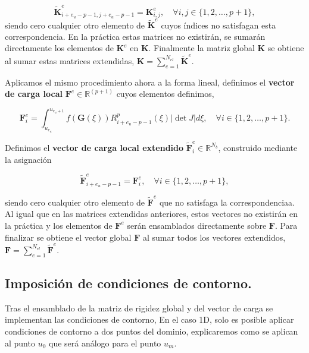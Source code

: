\documentclass[11pt]{book}
\theoremstyle{plain} %
\theoremstyle{definition} %
\theoremstyle{definition} %
\begin{document}
\begin{equation*}
    \widetilde{\mathbf{K}}^e_{i + e_u - p - 1,  j + e_u - p - 1} = \mathbf{K}_{i,j}^e,\quad \forall i,j \in \{1,2, \dots, p+1\},
\end{equation*}
\noindent
siendo cero cualquier otro elemento de $\widetilde{\mathbf{K}}^e$ cuyos índices no satisfagan esta correspondencia.
En la práctica estas matrices no existirán, se sumarán directamente los elementos de $\mathbf{K}^e$ en $\mathbf{K}$.
Finalmente la matriz global $\mathbf{K}$ se obtiene al sumar estas matrices extendidas, $\mathbf{K} = \sum_{e=1}^{N_{el}} \widetilde{\mathbf{K}}^e$.


Aplicamos el mismo procedimiento ahora a la forma lineal, definimos el \textbf{vector de carga local}  $\mathbf{F}^e \in \mathbb{R}^{(p+1)}$ cuyos elementos definimos,

\begin{equation*}
    \mathbf{F}^e_i=\int_{u_{e_u}}^{u_{e_u+1}}f(\mathbf{G}(\xi))R_{i+ e_u - p - 1}^p(\xi)|\det J|d\xi , \quad \forall i \in \{ 1,2, \dots ,p+1 \}.
\end{equation*}

Definimos el \textbf{vector de carga local extendido} $\widetilde{\mathbf{F}}^e_i \in \mathbb{R}^{N_b}$, construido mediante la asignación

\begin{equation*}
    \widetilde{\mathbf{F}}^e_{i+ e_u - p - 1}=\mathbf{F}^e_i, \quad \forall i \in \{ 1,2, \dots ,p+1 \},
\end{equation*}

siendo cero cualquier otro elemento de $\widetilde{\mathbf{F}}^e$ que no satisfaga la correspondenciaa. Al igual que en las matrices extendidas anteriores, estos vectores no existirán en la práctica y los elementos de $\mathbf{F}^e$ serán ensamblados directamente sobre $\mathbf{F}$.
Para finalizar se obtiene el vector global $\mathbf{F}$ al sumar todos los vectores extendidos, $\mathbf{F} = \sum_{e=1}^{N_{el}} \widetilde{\mathbf{F}}^e$.


\subsection{Imposición de condiciones de contorno.}
\label{sec:cond1D}
Tras el ensamblado de la matriz de rigidez global y del vector de carga se implementan las condiciones de contorno,
En el caso 1D, solo es posible aplicar condiciones de contorno a dos puntos del dominio, explicaremos como se aplican al punto $u_0$ que será análogo para el punto $u_m$.
\end{document}

